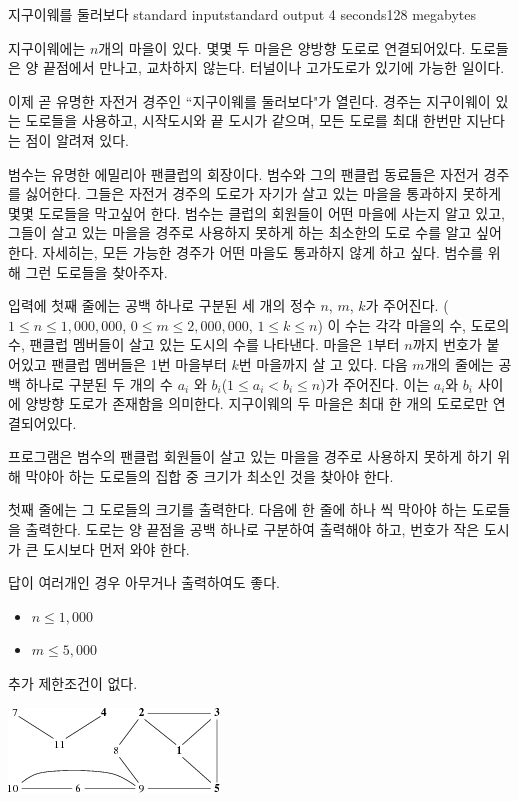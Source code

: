 \begin{problem}{지구이웨를 둘러보다}
	{standard input}{standard output}
	{4 seconds}{128 megabytes}{}
	
	지구이웨에는 $n$개의 마을이 있다. 몇몇 두 마을은 양방향 도로로 연결되어있다. 도로들은 양 끝점에서 만나고, 교차하지 않는다. 터널이나 고가도로가 있기에 가능한 일이다.
	
	이제 곧 유명한 자전거 경주인 ``지구이웨를 둘러보다"가 열린다. 경주는 지구이웨이 있는 도로들을 사용하고, 시작도시와 끝 도시가 같으며, 모든 도로를 최대 한번만 지난다는 점이 알려져 있다.
	
	범수는 유명한 에밀리아 팬클럽의 회장이다. 범수와 그의 팬클럽 동료들은 자전거 경주를 싫어한다. 그들은 자전거 경주의 도로가 자기가 살고 있는 마을을 통과하지 못하게 몇몇 도로들을 막고싶어 한다. 범수는 클럽의 회원들이 어떤 마을에 사는지 알고 있고, 그들이 살고 있는 마을을 경주로 사용하지 못하게 하는 최소한의 도로 수를 알고 싶어 한다. 자세히는, 모든 가능한 경주가 어떤 마을도 통과하지 않게 하고 싶다. 범수를 위해 그런 도로들을 찾아주자.
	

	\InputFile
	
	입력에 첫째 줄에는 공백 하나로 구분된 세 개의 정수 $n$, $m$, $k$가 주어진다. ($1 \le n \le 1,000,000$, $0 \le m \le 2,000,000$, $1\le k \le n$) 이 수는 각각 마을의 수, 도로의 수, 팬클럽 멤버들이 살고 있는 도시의 수를 나타낸다. 마을은 1부터 $n$까지 번호가 붙어있고 팬클럽 멤버들은 1번 마을부터 $k$번 마을까지 살 고 있다. 다음 $m$개의 줄에는 공백 하나로 구분된 두 개의 수 $a_i$ 와 $b_i$($1 \le a_i < b_i \le n$)가 주어진다. 이는 $a_i$와 $b_i$ 사이에 양방향 도로가 존재함을 의미한다. 지구이웨의 두 마을은 최대 한 개의 도로로만 연결되어있다.

	\OutputFile
	
	프로그램은 범수의 팬클럽 회원들이 살고 있는 마을을 경주로 사용하지 못하게 하기 위해 막야아 하는 도로들의 집합 중 크기가 최소인 것을 찾아야 한다.
	
	첫째 줄에는 그 도로들의 크기를 출력한다. 다음에 한 줄에 하나 씩 막아야 하는 도로들을 출력한다. 도로는 양 끝점을 공백 하나로 구분하여 출력해야 하고, 번호가 작은 도시가 큰 도시보다 먼저 와야 한다.
	
	답이 여러개인 경우 아무거나 출력하여도 좋다.
	
	\begin{itemize}
		\item $n \le 1,000$
		\item $m \le 5,000$
	\end{itemize}
	
	
	추가 제한조건이 없다.
	
	\Examples
		
	\begin{example}
	\end{example}
	
	\Note
	
	\includegraphics[]{tou.png}
	
\end{problem}

